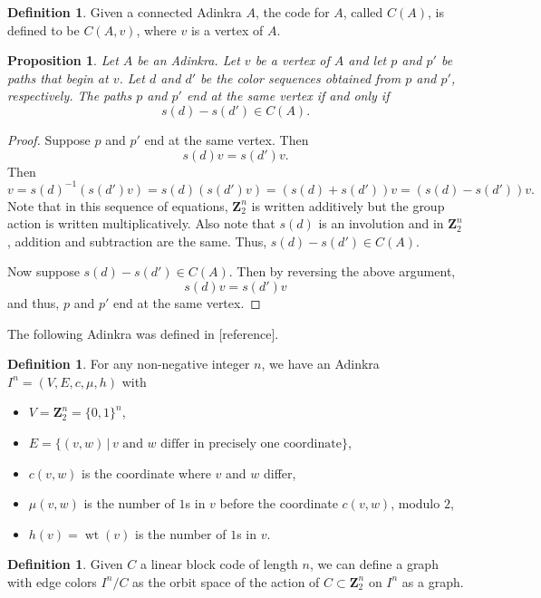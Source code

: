 \documentclass[12pt,twoside,singlespace]{article}
\numberwithin{equation}{section}
\newtheorem{prop}[equation]{Proposition}
\theoremstyle{definition}
\newtheorem{definition}[equation]{Definition}
\newcommand{\ZZ}{\mathbf{Z}}
\newcommand{\on}{\operatorname}
\newcommand{\wt}{\on{wt}}
\begin{document}
\begin{definition}
Given a connected Adinkra $A$, the code for $A$, called $C(A)$, is defined to be $C(A,v)$, where $v$ is a vertex of $A$.
\end{definition}




\begin{prop}
\label{prop:paths}
Let $A$ be an Adinkra.  Let $v$ be a vertex of $A$ and let $p$ and $p'$ be paths that begin at $v$.  Let $d$ and $d'$ be the color sequences obtained from $p$ and $p'$, respectively.  The paths $p$ and $p'$ end at the same vertex if and only if 
\[s(d)-s(d')\in C(A).\]
\end{prop}

\begin{proof}
Suppose $p$ and $p'$ end at the same vertex.  Then
\[s(d)v=s(d')v.\]
Then
\[v=s(d)^{-1}(s(d')v)=s(d)(s(d')v)=(s(d)+s(d'))v=(s(d)-s(d'))v.\]
Note that in this sequence of equations, $\ZZ_2^n$ is written additively but the group action is written multiplicatively.  Also note that $s(d)$ is an involution and in $\ZZ_2^n$, addition and subtraction are the same.  Thus, $s(d)-s(d')\in C(A)$.

Now suppose $s(d)-s(d')\in C(A)$.  Then by reversing the above argument,
\[s(d)v=s(d')v\]
and thus, $p$ and $p'$ end at the same vertex.
\end{proof}



The following Adinkra was defined in [reference].
\begin{definition}
For any non-negative integer $n$, we have an Adinkra $I^n=(V,E,c,\mu,h)$ with
\begin{itemize}
\item $V=\ZZ_2^n=\{0,1\}^n$,
\item $E=\{(v,w)\,|\,\mbox{$v$ and $w$ differ in precisely one coordinate}\}$,
\item $c(v,w)$ is the coordinate where $v$ and $w$ differ,
\item $\mu(v,w)$ is the number of $1$s in $v$ before the coordinate $c(v,w)$, modulo $2$,
\item $h(v)=\wt(v)$ is the number of $1$s in $v$.
\end{itemize}
\end{definition}

\begin{definition}
Given $C$ a linear block code of length $n$, we can define a graph with edge colors $I^n/C$ as the orbit space of the action of $C\subset \ZZ_2^n$ on $I^n$ as a graph.
\end{definition}
\end{document}
